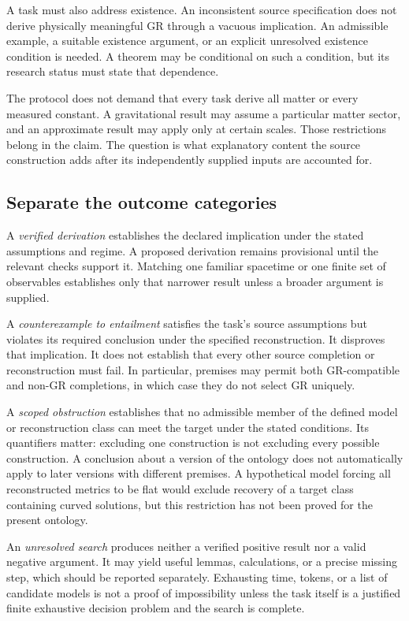 \documentclass[11pt,oneside]{report}
\theoremstyle{remark}
\numberwithin{definition}{chapter}
\numberwithin{proposition}{chapter}
\numberwithin{remark}{chapter}
\begin{document}
A task must also address existence. An inconsistent source specification does not derive physically meaningful GR through a vacuous implication. An admissible example, a suitable existence argument, or an explicit unresolved existence condition is needed. A theorem may be conditional on such a condition, but its research status must state that dependence.

The protocol does not demand that every task derive all matter or every measured constant. A gravitational result may assume a particular matter sector, and an approximate result may apply only at certain scales. Those restrictions belong in the claim. The question is what explanatory content the source construction adds after its independently supplied inputs are accounted for.

\subsection{Separate the outcome categories}
A \emph{verified derivation} establishes the declared implication under the stated assumptions and regime. A proposed derivation remains provisional until the relevant checks support it. Matching one familiar spacetime or one finite set of observables establishes only that narrower result unless a broader argument is supplied.

A \emph{counterexample to entailment} satisfies the task's source assumptions but violates its required conclusion under the specified reconstruction. It disproves that implication. It does not establish that every other source completion or reconstruction must fail. In particular, premises may permit both GR-compatible and non-GR completions, in which case they do not select GR uniquely.

A \emph{scoped obstruction} establishes that no admissible member of the defined model or reconstruction class can meet the target under the stated conditions. Its quantifiers matter: excluding one construction is not excluding every possible construction. A conclusion about a version of the ontology does not automatically apply to later versions with different premises. A hypothetical model forcing all reconstructed metrics to be flat would exclude recovery of a target class containing curved solutions, but this restriction has not been proved for the present ontology.

An \emph{unresolved search} produces neither a verified positive result nor a valid negative argument. It may yield useful lemmas, calculations, or a precise missing step, which should be reported separately. Exhausting time, tokens, or a list of candidate models is not a proof of impossibility unless the task itself is a justified finite exhaustive decision problem and the search is complete.
\end{document}
